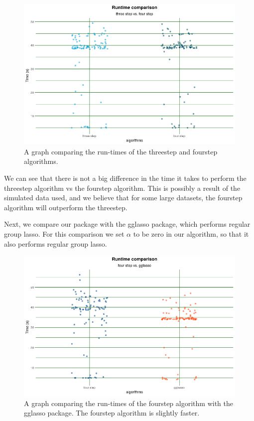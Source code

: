 \documentclass[12pt]{article}
\begin{document}
\begin{figure}[tb!]
\centering
\includegraphics[scale=0.5]{compare_threefour.png}
\caption{A graph comparing the run-times of the threestep and fourstep algorithms.}
\label{fig:threevsfour}
\end{figure}


We can see that there is not a big difference in the time it takes to perform the threestep algorithm vs the fourstep algorithm. This is possibly a result of the simulated data used, and we believe that for some large datasets, the fourstep algorithm will outperform the threestep.

Next, we compare our package with the gglasso package, which performs regular group lasso. For this comparison we set $\alpha$ to be zero in our algorithm, so that it also performs regular group lasso. 

\begin{figure}[tb!]
\centering
\includegraphics[scale=0.5]{compare_fourgglasso.png}
\caption{A graph comparing the run-times of the fourstep algorithm with the gglasso package. The fourstep algorithm is slightly faster.}
\label{fig:1fourvsgglasso}
\end{figure}
\end{document}
